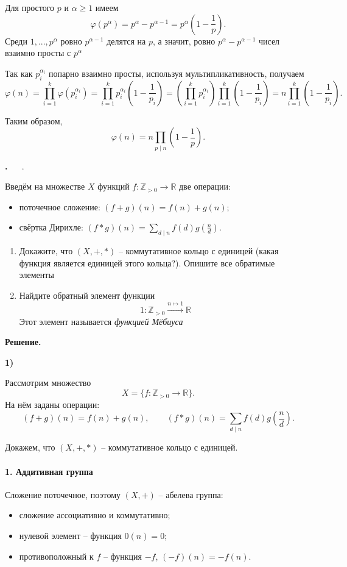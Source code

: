 \documentclass[12pt,a4paper]{article}
\newcounter{task}                   %
\newenvironment{task}[1][]{%
  \refstepcounter{task}%
  \par\vspace{0.3\baselineskip}%
  \noindent\textbf{\thetask.}%
  \if\relax\detokenize{#1}\relax   %
    \ \ignorespaces                 %
  \else
    \ \textbf{#1}.\ \ignorespaces   %
  \fi
}{%
  \par\vspace{0.2\baselineskip}%
}
\newcommand{\sol}{%
  \par\vspace{0.3\baselineskip}%
  \noindent\textbf{Решение.}\ %
  \ignorespaces                     %
}
\newcommand{\soli}[1]{%
  \par\vspace{0.15\baselineskip}%
  \noindent\textbf{#1)}\ %
  \ignorespaces                     %
}
\begin{document}
Для простого $p$ и $\alpha \ge 1$ имеем
\[
\varphi(p^\alpha) = p^\alpha - p^{\alpha-1} = p^\alpha \left(1 - \frac{1}{p}\right).
\]
Среди $1, ..., p^\alpha$ ровно $p^{\alpha - 1}$ делятся на $p$, а значит, ровно $p^\alpha - p^{\alpha-1}$ чисел взаимно просты с $p^\alpha$

Так как $p_i^{\alpha_i}$ попарно взаимно просты, используя мультипликативность, получаем
\[
\varphi(n) = \prod_{i=1}^{k} \varphi(p_i^{\alpha_i})
= \prod_{i=1}^{k} p_i^{\alpha_i} \left(1 - \frac{1}{p_i}\right)
= \left(\prod_{i=1}^{k} p_i^{\alpha_i}\right) \prod_{i=1}^{k} \left(1 - \frac{1}{p_i}\right)
= n \prod_{i=1}^{k} \left(1 - \frac{1}{p_i}\right).
\]

Таким образом,
\[
\boxed{\varphi(n) = n \prod_{p \mid n} \left(1 - \frac{1}{p}\right)}.
\]


\begin{task}
    Введём на множестве $X$ функций $f : \mathbb{Z}_{>0} \to \mathbb{R}$ две операции:
    \begin{itemize}
	\item поточечное сложение: $(f+g)(n) = f(n) + g(n)$;
	\item свёртка Дирихле: $(f * g)(n) = \sum_{d \mid n} f(d) g(\frac{n}{d})$.
    \end{itemize}
    \begin{enumerate}
	\item Докажите, что $(X, +, *)$ -- коммутативное кольцо с единицей (какая функция является единицей этого кольца?). Опишите все обратимые элементы

	\item Найдите обратный элемент функции 
	    \[1: \mathbb{Z}_{>0} \xrightarrow{n \mapsto 1} \mathbb{R} \]
	    Этот элемент называется \textit{функцией Мёбиуса}
    \end{enumerate}
\end{task}

\sol
\soli{1}

Рассмотрим множество
\[
X=\{f:\mathbb Z_{>0}\to \mathbb R\}.
\]
На нём заданы операции:
\[
(f+g)(n)=f(n)+g(n),\qquad 
(f*g)(n)=\sum_{d\mid n} f(d)g\!\left(\frac nd\right).
\]

Докажем, что $(X,+,*)$ -- коммутативное кольцо с единицей.

\paragraph{1. Аддитивная группа}
Сложение поточечное, поэтому $(X,+)$ -- абелева группа:
\begin{itemize}
\item сложение ассоциативно и коммутативно;
\item нулевой элемент -- функция $0(n)=0$;
\item противоположный к $f$ -- функция $-f$, $(-f)(n)=-f(n)$.
\end{itemize}
\end{document}

